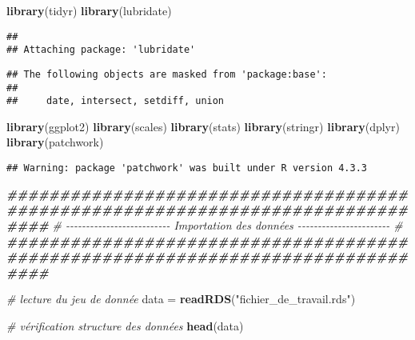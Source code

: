 \documentclass[
]{article}
\newenvironment{Shaded}{\begin{snugshade}}{\end{snugshade}}
\newcommand{\CommentTok}[1]{\textcolor[rgb]{0.56,0.35,0.01}{\textit{#1}}}
\newcommand{\DocumentationTok}[1]{\textcolor[rgb]{0.56,0.35,0.01}{\textbf{\textit{#1}}}}
\newcommand{\FunctionTok}[1]{\textcolor[rgb]{0.13,0.29,0.53}{\textbf{#1}}}
\newcommand{\NormalTok}[1]{#1}
\newcommand{\OtherTok}[1]{\textcolor[rgb]{0.56,0.35,0.01}{#1}}
\newcommand{\StringTok}[1]{\textcolor[rgb]{0.31,0.60,0.02}{#1}}
\begin{document}
\begin{Shaded}
\begin{Highlighting}[]
\FunctionTok{library}\NormalTok{(tidyr)      }
\FunctionTok{library}\NormalTok{(lubridate)  }
\end{Highlighting}
\end{Shaded}

\begin{verbatim}
## 
## Attaching package: 'lubridate'
\end{verbatim}

\begin{verbatim}
## The following objects are masked from 'package:base':
## 
##     date, intersect, setdiff, union
\end{verbatim}

\begin{Shaded}
\begin{Highlighting}[]
\FunctionTok{library}\NormalTok{(ggplot2)   }
\FunctionTok{library}\NormalTok{(scales)   }
\FunctionTok{library}\NormalTok{(stats)    }
\FunctionTok{library}\NormalTok{(stringr)   }
\FunctionTok{library}\NormalTok{(dplyr)}
\FunctionTok{library}\NormalTok{(patchwork)}
\end{Highlighting}
\end{Shaded}

\begin{verbatim}
## Warning: package 'patchwork' was built under R version 4.3.3
\end{verbatim}

\begin{Shaded}
\begin{Highlighting}[]
\DocumentationTok{\#\#\#\#\#\#\#\#\#\#\#\#\#\#\#\#\#\#\#\#\#\#\#\#\#\#\#\#\#\#\#\#\#\#\#\#\#\#\#\#\#\#\#\#\#\#\#\#\#\#\#\#\#\#\#\#\#\#\#\#\#\#\#\#\#\#\#\#\#\#\#\#\#\#\#\#\#\#\#\#}
\CommentTok{\# {-}{-}{-}{-}{-}{-}{-}{-}{-}{-}{-}{-}{-}{-}{-}{-}{-}{-}{-}{-}{-}{-}{-}{-}{-}{-}  Importation des données  {-}{-}{-}{-}{-}{-}{-}{-}{-}{-}{-}{-}{-}{-}{-}{-}{-}{-}{-}{-}{-}{-}{-} \#}
\DocumentationTok{\#\#\#\#\#\#\#\#\#\#\#\#\#\#\#\#\#\#\#\#\#\#\#\#\#\#\#\#\#\#\#\#\#\#\#\#\#\#\#\#\#\#\#\#\#\#\#\#\#\#\#\#\#\#\#\#\#\#\#\#\#\#\#\#\#\#\#\#\#\#\#\#\#\#\#\#\#\#\#\#}

\CommentTok{\# lecture du jeu de donnée}
\NormalTok{data }\OtherTok{=} \FunctionTok{readRDS}\NormalTok{(}\StringTok{"fichier\_de\_travail.rds"}\NormalTok{) }

\CommentTok{\# vérification structure des données }
\FunctionTok{head}\NormalTok{(data)}
\end{Highlighting}
\end{Shaded}
\end{document}
